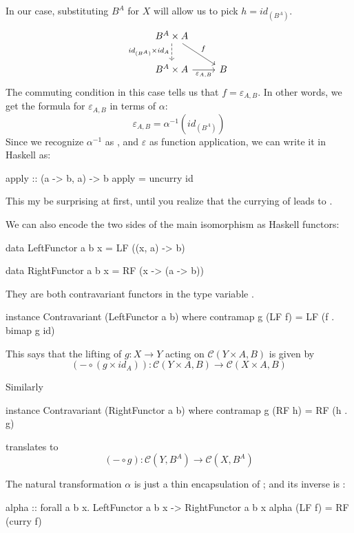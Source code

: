 \documentclass[DaoFP]{subfiles}
\begin{document}
In our case, substituting $B^A$ for $X$ will allow us to pick $h = id_{(B^A)}$.
\[
 \begin{tikzcd}
 B^A \times A
 \arrow[d, dashed, "id_{(B^A)} \times id_A"']
 \arrow[rd, "f"]
 \\
 B^A \times A
 \arrow[r, "\varepsilon_{A, B}"']
& B
 \end{tikzcd}
\]
The commuting condition in this case tells us that $f = \varepsilon_{A, B}$. In other words, we get the formula for $\varepsilon_{A, B}$ in terms of $\alpha$:
\[ \varepsilon_{A, B} = \alpha^{-1} (id_{(B^A)}) \]
Since we recognize $\alpha^{-1}$ as , and $\varepsilon$ as function application, we can write it in Haskell as:
\begin{haskell}
apply :: (a -> b, a) -> b
apply = uncurry id
\end{haskell}
This my be surprising at first, until you realize that the currying of  leads to .

We can also encode the two sides of the main isomorphism as Haskell functors:
\begin{haskell}
data LeftFunctor  a b x = LF ((x, a) -> b)
\end{haskell}
\begin{haskell}
data RightFunctor a b x = RF (x -> (a -> b))
\end{haskell}
They are both contravariant functors in the type variable .
\begin{haskell}
instance Contravariant (LeftFunctor a b) where
  contramap g (LF f) = LF (f . bimap g id)
\end{haskell}
This says that the lifting of $g \colon X \to Y$ acting on $ \mathcal{C}(Y \times A, B)$ is given by
\[ (- \circ (g \times id_A)) \colon\mathcal{C}(Y \times A, B) \to  \mathcal{C}(X \times A, B)\]

Similarly
\begin{haskell}
instance Contravariant (RightFunctor a b) where
  contramap g (RF h) = RF (h . g)
\end{haskell}
translates to 
\[ (- \circ g) \colon  \mathcal{C}(Y, B^A) \to \mathcal{C}(X, B^A) \]

The natural transformation $\alpha$ is just a thin encapsulation of ; and its inverse is :

\begin{haskell}
alpha :: forall a b x. LeftFunctor a b x -> RightFunctor a b x
alpha (LF f) = RF (curry f)
\end{haskell}
\end{document}
